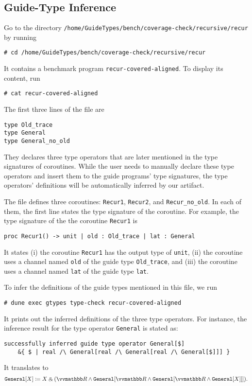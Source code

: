 \subsection{Guide-Type Inference}
\label{sec:Guide-Type Inference}

Go to the directory
\texttt{/home/GuideTypes/bench/coverage-check/recursive/recur} by running
\begin{verbatim}
# cd /home/GuideTypes/bench/coverage-check/recursive/recur
\end{verbatim}
%
It contains a benchmark program \texttt{recur-covered-aligned}.
%
To display its content, run
\begin{verbatim}
# cat recur-covered-aligned
\end{verbatim}

The first three lines of the file are
\begin{verbatim}
type Old_trace
type General
type General_no_old
\end{verbatim}
%
They declares three type operators that are later mentioned in the type
signatures of coroutines.
%
While the user needs to manually declare these type operators and insert them to
the guide programs' type signatures, the type operators' definitions will be
automatically inferred by our artifact.

The file defines three coroutines: \texttt{Recur1}, \texttt{Recur2},
and \texttt{Recur\_no\_old}.
%
In each of them, the first line states the type signature of the coroutine.
%
For example, the type signature of the the coroutine \texttt{Recur1} is
\begin{verbatim}
proc Recur1() -> unit | old : Old_trace | lat : General
\end{verbatim}
%
It states (i) the coroutine \texttt{Recur1} has the output type of
\texttt{unit}, (ii) the coroutine uses a channel named \texttt{old} of the guide
type \texttt{Old\_trace}, and (iii) the coroutine uses a channel named
\texttt{lat} of the guide type \texttt{lat}.

To infer the definitions of the guide types mentioned in this file, we run
\begin{verbatim}
# dune exec gtypes type-check recur-covered-aligned
\end{verbatim}
%
It prints out the inferred definitions of the three type operators.
%
For instance, the inference result for the type operator \texttt{General} is
stated as:
\begin{verbatim}
successfully inferred guide type operator General[$]
	&{ $ | real /\ General[real /\ General[real /\ General[$]]] }
\end{verbatim}
%
It translates to
\begin{equation*}
  \texttt{General} [X] \coloneq X \echoice (\treal \land \texttt{General} [\treal \land \texttt{General} [\treal \land \texttt{General} [X]]]).
\end{equation*}

